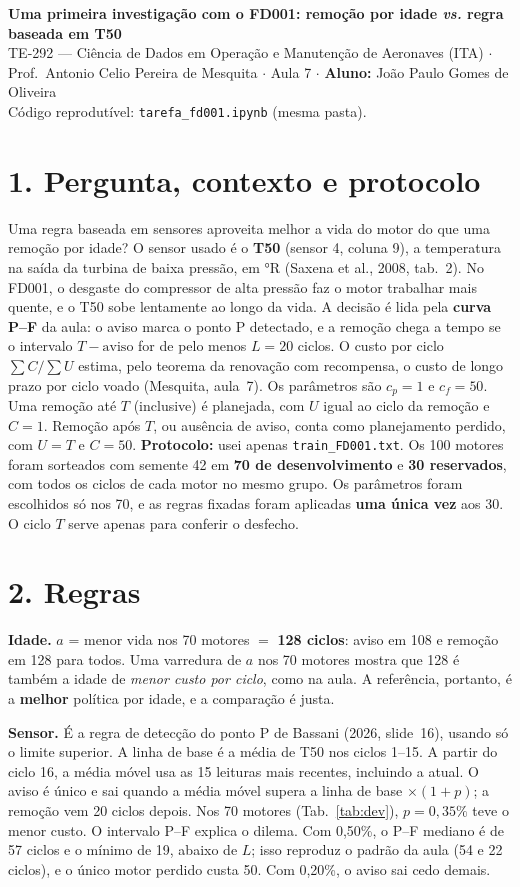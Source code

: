 \documentclass[12pt,a4paper]{article}
\begin{document}
{\large\textbf{Uma primeira investigação com o FD001: remoção por idade \textit{vs.} regra baseada em T50}}\\[2pt]
\small TE-292 --- Ciência de Dados em Operação e Manutenção de Aeronaves (ITA) $\cdot$ Prof.\ Antonio Celio Pereira de Mesquita $\cdot$ Aula 7 $\cdot$ \textbf{Aluno:} João Paulo Gomes de Oliveira\\
\small Código reprodutível: \texttt{tarefa\_fd001.ipynb} (mesma pasta).
\normalsize

\section*{1. Pergunta, contexto e protocolo}
Uma regra baseada em sensores aproveita melhor a vida do motor do que uma remoção por idade? O sensor usado é o \textbf{T50}
(sensor 4, coluna 9), a temperatura na saída da turbina de baixa pressão, em °R (Saxena et al., 2008, tab.~2). No FD001, o desgaste
do compressor de alta pressão faz o motor trabalhar mais quente, e o T50 sobe lentamente ao longo da vida. A decisão é lida pela
\textbf{curva P--F} da aula: o aviso marca o ponto P detectado, e a remoção chega a tempo se o intervalo $T-\text{aviso}$ for de pelo
menos $L=20$ ciclos. O custo por ciclo $\sum C/\sum U$ estima, pelo teorema da renovação com recompensa, o custo de longo prazo por
ciclo voado (Mesquita, aula~7). Os parâmetros são $c_p=1$ e $c_f=50$. Uma remoção até $T$ (inclusive) é planejada, com $U$ igual
ao ciclo da remoção e $C=1$. Remoção após $T$, ou ausência de aviso, conta como planejamento perdido, com $U=T$ e $C=50$.
\textbf{Protocolo:} usei apenas \texttt{train\_FD001.txt}. Os 100 motores foram sorteados com semente 42 em \textbf{70 de
desenvolvimento} e \textbf{30 reservados}, com todos os ciclos de cada motor no mesmo grupo. Os parâmetros foram escolhidos só nos
70, e as regras fixadas foram aplicadas \textbf{uma única vez} aos 30. O ciclo $T$ serve apenas para conferir o desfecho.

\section*{2. Regras}
\textbf{Idade.} $a$ = menor vida nos 70 motores $=$ \textbf{128 ciclos}: aviso em 108 e remoção em 128 para todos. Uma varredura
de $a$ nos 70 motores mostra que 128 é também a idade de \emph{menor custo por ciclo}, como na aula. A referência, portanto, é a
\textbf{melhor} política por idade, e a comparação é justa.

\textbf{Sensor.} É a regra de detecção do ponto P de Bassani (2026, slide~16), usando só o limite superior. A linha de base é a
média de T50 nos ciclos 1--15. A partir do ciclo 16, a média móvel usa as 15 leituras mais recentes, incluindo a atual. O aviso é
único e sai quando a média móvel supera a linha de base $\times(1+p)$; a remoção vem 20 ciclos depois. Nos 70 motores
(Tab.~\ref{tab:dev}), \textbf{$p=0{,}35\%$} teve o menor custo. O intervalo P--F explica o dilema. Com 0,50\%, o P--F mediano é de
57 ciclos e o mínimo de 19, abaixo de $L$; isso reproduz o padrão da aula (54 e 22 ciclos), e o único motor perdido custa 50. Com
0,20\%, o aviso sai cedo demais.
\end{document}

